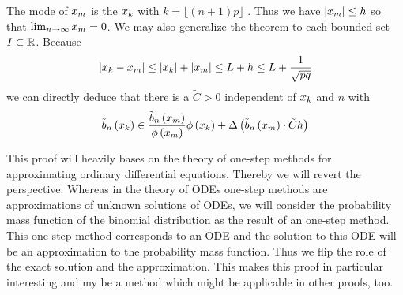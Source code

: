 \begin{remark} \label{remark:alt_local}
  The mode of $\xnp$ is the $\x[k]$ with $k = \lfloor (n+1)p \rfloor$ \cite{nicolas}\cite{wiki:binomial_distribution}. Thus we have $\abs{\xnp} \le h$ so that $\lim_{n\to\infty} \xnp = 0$. We may also generalize the theorem to each bounded set $I \subset \R$.  Because
  \begin{align}
    \abs{\x[k]-\xnp} \le \abs{\x[k]}+\abs{\xnp} \le L + h \le L + \frac{1}{\sqrt{pq}}
  \end{align}
  we can directly deduce that there is a $\tilde C > 0$ independent of $\x$ and $n$ with
  \begin{align}
    \bb{\x} \in \frac{\bnp}{\fphi{\xnp}}\fphi{\x} + \bigabs{{\bnp}\cdot \tilde Ch}
  \end{align}
\end{remark}

This proof will heavily bases on the theory of one-step methods for approximating ordinary differential equations. Thereby we will revert the perspective: Whereas in the theory of ODEs one-step methods are approximations of unknown solutions of ODEs, we will consider the probability mass function of the binomial distribution as the result of an one-step method. This one-step method corresponds to an ODE and the solution to this ODE will be an approximation to the probability mass function. Thus we flip the role of the exact solution and the approximation. This makes this proof in particular interesting and my be a method which might be applicable in other proofs, too.

